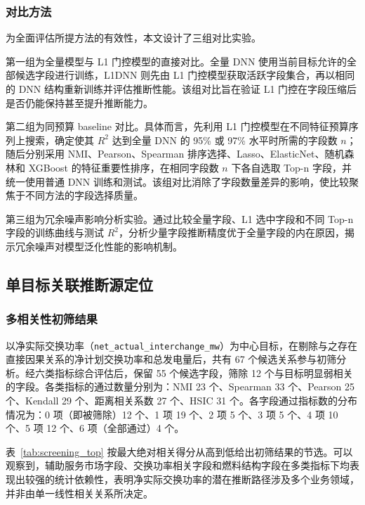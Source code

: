 \documentclass[UTF8,zihao=5,twoside]{ctexart}
\numberwithin{equation}{section}
\newcommand{\code}[1]{\texttt{#1}}
\begin{document}
\subsubsection{对比方法}
为全面评估所提方法的有效性，本文设计了三组对比实验。

第一组为全量模型与 L1 门控模型的直接对比。全量 DNN 使用当前目标允许的全部候选字段进行训练，L1DNN 则先由 L1 门控模型获取活跃字段集合，再以相同的 DNN 结构重新训练并评估推断性能。该组对比旨在验证 L1 门控在字段压缩后是否仍能保持甚至提升推断能力。

第二组为同预算 baseline 对比。具体而言，先利用 L1 门控模型在不同特征预算序列上搜索，确定使其 $R^2$ 达到全量 DNN 的 95\% 或 97\% 水平时所需的字段数 $n$；随后分别采用 NMI、Pearson、Spearman 排序选择、Lasso、ElasticNet、随机森林和 XGBoost 的特征重要性排序，在相同字段数 $n$ 下各自选取 Top-n 字段，并统一使用普通 DNN 训练和测试。该组对比消除了字段数量差异的影响，使比较聚焦于不同方法的字段选择质量。

第三组为冗余噪声影响分析实验。通过比较全量字段、L1 选中字段和不同 Top-n 字段的训练曲线与测试 $R^2$，分析少量字段推断精度优于全量字段的内在原因，揭示冗余噪声对模型泛化性能的影响机制。

\subsection{单目标关联推断源定位}
\subsubsection{多相关性初筛结果}
以净实际交换功率（\code{net\_actual\_interchange\_mw}）为中心目标，在剔除与之存在直接因果关系的净计划交换功率和总发电量后，共有 67 个候选关系参与初筛分析。经六类指标综合评估后，保留 55 个候选字段，筛除 12 个与目标明显弱相关的字段。各类指标的通过数量分别为：NMI 23 个、Spearman 33 个、Pearson 25 个、Kendall 29 个、距离相关系数 27 个、HSIC 31 个。各字段通过指标数的分布情况为：0 项（即被筛除）12 个、1 项 19 个、2 项 5 个、3 项 5 个、4 项 10 个、5 项 12 个、6 项（全部通过）4 个。

表~\ref{tab:screening_top} 按最大绝对相关得分从高到低给出初筛结果的节选。可以观察到，辅助服务市场字段、交换功率相关字段和燃料结构字段在多类指标下均表现出较强的统计依赖性，表明净实际交换功率的潜在推断路径涉及多个业务领域，并非由单一线性相关关系所决定。
\end{document}
